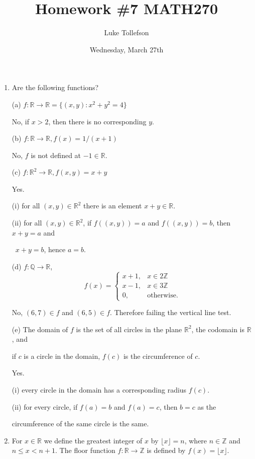 \documentclass[12pt]{article}
\begin{document}
	
	\title{\Large Homework \#7 MATH270}
	\author{Luke Tollefson}
	\date{Wednesday, March 27th}
	
	\maketitle
	
		\begin{enumerate}
		\item Are the following functions?
		
		(a) $f:\mathbb{R}\to\mathbb{R}=\{(x,y):x^2+y^2=4 \}$
		
		\qquad No, if $x>2$, then there is no corresponding $y$.
		
		(b) $f:\mathbb{R}\to\mathbb{R}, f(x)=1/(x+1)$
		
		\qquad No, $f$ is not defined at $-1\in\mathbb{R}$.
		
		(c) $f:\mathbb{R}^2\to\mathbb{R}, f(x,y)=x+y$
		
		\qquad Yes.
		
		\qquad (i) for all $(x,y)\in\mathbb{R}^2$ there is an element $x+y\in\mathbb{R}$.
		
		\qquad (ii) for all $(x,y)\in\mathbb{R}^2$, if $f((x,y))=a$ and $f((x,y))=b$, then $x+y=a$ and 
		
		\qquad \ $x+y=b$, hence $a=b$.
				
		(d) $f:\mathbb{Q}\to\mathbb{R}$,
		\[ f(x)=
		\begin{cases}
		x+1, &x\in 2\mathbb{Z}\\
		x-1, &x\in 3\mathbb{Z}\\
		0, &\text{otherwise}.
	    \end{cases}
		\]
		
		\qquad No, $(6,7)\in f$ and $(6,5)\in f$. Therefore failing the vertical line test.
		
		(e) The domain of $f$ is the set of all circles in the plane $\mathbb{R}^2$, the codomain is $\mathbb{R}$, and 
		
		 if $c$ is a circle in the domain, $f(c)$ is the circumference of $c$.
		 
		 \qquad Yes.
		 
		 \qquad (i) every circle in the domain has a corresponding radius $f(c)$.
		 
		 \qquad (ii) for every circle, if $f(a)=b$ and $f(a)=c$, then $b=c$ as the 
		 
		 \qquad circumference of the same circle is the same.
				
		 \item For $x\in\mathbb{R}$ we define the greatest integer of $x$ by $\lfloor x\rfloor=n$, where $n\in\mathbb{Z}$ and $n\leq x<n+1$. The floor function $f:\mathbb{R}\to\mathbb{Z}$ is defined by $f(x)=\lfloor x\rfloor$.
		 

\end{enumerate}
\end{document}
